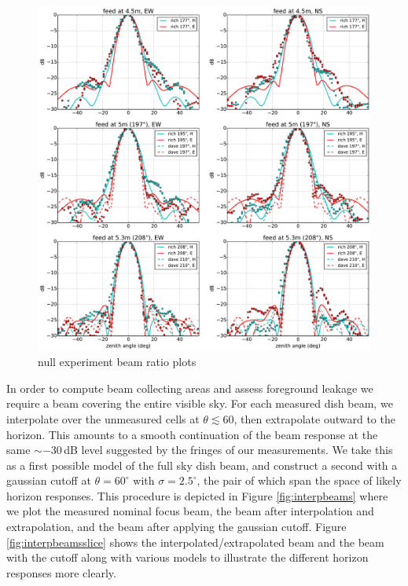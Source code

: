 \documentclass{emulateapj}
\begin{document}
\begin{figure}[t]
\centering
\includegraphics[width=6.7in]{measured_beams_and_models_slices.pdf}
\caption{null experiment beam ratio plots}
\label{fig:measuredbeamslices}
\end{figure}

In order to compute beam collecting areas and assess foreground leakage we require a beam covering the entire visible sky. For each measured dish beam, we interpolate over the unmeasured cells at $\theta\lesssim60$, then extrapolate outward to the horizon. This amounts to a smooth continuation of the beam response at the same $\sim-30$\,dB level suggested by the fringes of our measurements. We take this as a first possible model of the full sky dish beam, and construct a second with a gaussian cutoff at $\theta=60^\circ$ with $\sigma=2.5^\circ$, the pair of which span the space of likely horizon responses. This procedure is depicted in Figure \ref{fig:interpbeams} where we plot the measured nominal focus beam, the beam after interpolation and extrapolation, and the beam after applying the gaussian cutoff. Figure \ref{fig:interpbeamsslice} shows the interpolated/extrapolated beam and the beam with the cutoff along with various models to illustrate the different horizon responses more clearly.
\end{document}
